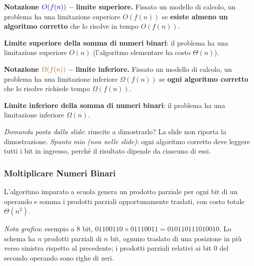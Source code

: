 \documentclass[12pt, a4paper]{article}
\begin{document}
\begin{tcolorbox}[colback=lightergray!10, colframe=tocsec, title=\textbf{Definizione: Limite Superiore alla Complessità di un Problema}]
\label{def:limite-superiore-problema}
\textbf{Notazione $\textcolor{blue!70!black}{O(f(n))}$ -- limite superiore.} Fissato un modello di calcolo, un problema ha una limitazione superiore $O(f(n))$ se \textbf{esiste almeno un algoritmo corretto} che lo risolve in tempo $O(f(n))$.
\end{tcolorbox}

\textbf{Limite superiore della somma di numeri binari}: il problema ha una limitazione superiore $O(n)$ (l'algoritmo elementare ha costo $\Theta(n)$).

\begin{tcolorbox}[colback=lightergray!10, colframe=tocsec, title=\textbf{Definizione: Limite Inferiore alla Complessità di un Problema}]
\label{def:limite-inferiore-problema}
\textbf{Notazione $\textcolor{orange!70!black}{\Omega(f(n))}$ -- limite inferiore.} Fissato un modello di calcolo, un problema ha una limitazione inferiore $\Omega(f(n))$ se \textbf{ogni algoritmo corretto} che lo risolve richiede tempo $\Omega(f(n))$.
\end{tcolorbox}

\textbf{Limite inferiore della somma di numeri binari}: il problema ha una limitazione inferiore $\Omega(n)$.

\textit{Domanda posta dalla slide}: riuscite a dimostrarlo? La slide non riporta la dimostrazione. \textit{Spunto mio (non nelle slide)}: ogni algoritmo corretto deve leggere tutti i bit in ingresso, perché il risultato dipende da ciascuno di essi.

\subsubsection{Moltiplicare Numeri Binari}

\begin{tcolorbox}[colback=lightergray!10, colframe=tocsec, title=\textbf{Algoritmo Elementare del Prodotto}]
L'algoritmo imparato a scuola genera un prodotto parziale per ogni bit di un operando e somma i prodotti parziali opportunamente traslati, con costo totale $\Theta(n^2)$.
\end{tcolorbox}

\textit{Nota grafica}: esempio a 8 bit, $01100110 \times 01110011 = 010110111010010$. Lo schema ha $n$ prodotti parziali di $n$ bit, ognuno traslato di una posizione in più verso sinistra rispetto al precedente; i prodotti parziali relativi ai bit $0$ del secondo operando sono righe di zeri.
\end{document}
